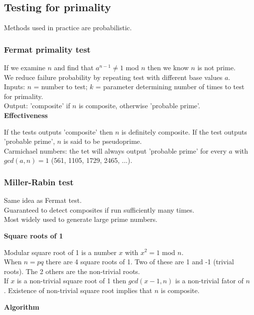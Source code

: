 \documentclass{article}
\begin{document}
\subsection{Testing for primality}

Methods used in practice are probabilistic.

\subsubsection{Fermat primality test}

If we examine $n$ and find that $a^{n-1} \neq 1$ mod $n$ then we know $n$ is not prime.\\
We reduce failure probability by repeating test with different base values $a$.\\

Inputs: $n$ = number to test; $k$ = parameter determining number of times to test for primality.\\
Output: 'composite' if $n$ is composite, otherwise 'probable prime'.\\

\textbf{Effectiveness}

If the tests outputs 'composite' then $n$ is definitely composite. If the test outputs 'probable prime', $n$ is said to be pseudoprime.\\
Carmichael numbers: the tet will always output 'probable prime' for every $a$ with $gcd(a,n) = 1$ (561, 1105, 1729, 2465, ...).

\subsubsection{Miller-Rabin test}

Same idea as Fermat test. \\
Guaranteed to detect composites if run sufficiently many times.\\
Most widely used to generate large prime numbers.

\textbf{Square roots of 1}

Modular square root of 1 is a number $x$ with $x^2 = 1$ mod $n$.\\
When $n=pq$ there are 4 square roots of 1. Two of these are 1 and -1 (trivial roots). The 2 others are the non-trivial roots.\\
If $x$ is a non-trivial square root of 1 then $gcd(x-1,n)$ is a non-trivial fator of $n$. Existence of non-trivial square root implies that $n$ is composite.

\textbf{Algorithm}
\end{document}

